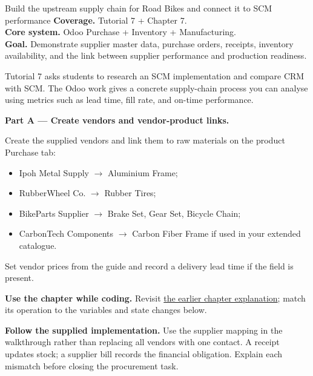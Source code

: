 
\begin{labproject}{Build the upstream supply chain for Road Bikes and connect it to SCM performance}
\textbf{Coverage.} Tutorial 7 + Chapter 7.\\
\textbf{Core system.} Odoo Purchase + Inventory + Manufacturing.\\
\textbf{Goal.} Demonstrate supplier master data, purchase orders, receipts, inventory availability, and the link between supplier performance and production readiness.




\begin{labmode}
Tutorial 7 asks students to research an SCM implementation and compare CRM with SCM. The Odoo work gives a concrete supply-chain process you can analyse using metrics such as lead time, fill rate, and on-time performance.
\end{labmode}

\medskip\noindent\textbf{Part A --- Create vendors and vendor-product links.}

Create the supplied vendors and link them to raw materials on the product Purchase tab:
\begin{itemize}
  \item Ipoh Metal Supply $\rightarrow$ Aluminium Frame;
  \item RubberWheel Co. $\rightarrow$ Rubber Tires;
  \item BikeParts Supplier $\rightarrow$ Brake Set, Gear Set, Bicycle Chain;
  \item CarbonTech Components $\rightarrow$ Carbon Fiber Frame if used in your extended catalogue.
\end{itemize}

Set vendor prices from the guide and record a delivery lead time if the field is present.




\textbf{Use the chapter while coding.} Revisit \hyperref[ch:scm]{the earlier chapter explanation}; match its operation to the variables and state changes below.

\textbf{Follow the supplied implementation.} Use the supplier mapping in the walkthrough rather than replacing all vendors with one contact. A receipt updates stock; a supplier bill records the financial obligation. Explain each mismatch before closing the procurement task.



\end{labproject}
